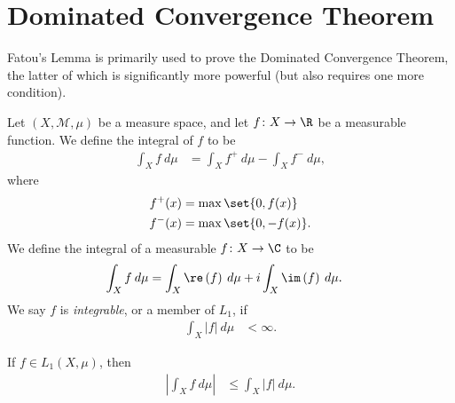\documentclass[10pt]{mypackage}
\begin{document}
\section{Dominated Convergence Theorem}%
Fatou's Lemma is primarily used to prove the Dominated Convergence Theorem, the latter of which is significantly more powerful (but also requires one more condition).
\begin{definition}
  Let $\left( X,\mathcal{M},\mu \right)$ be a measure space, and let $f\colon X\rightarrow \R$ be a measurable function. We define the integral of $f$ to be
  \begin{align*}
    \int_{X}^{} f\:d\mu &= \int_{X}^{} f^{+}\:d\mu - \int_{X}^{} f^{-}\:d\mu,
  \end{align*}
  where
  \begin{align*}
    f^{+}(x) &= \max\set{0,f(x)}\\
    f^{-}(x) &= \max\set{0,-f(x)}.
  \end{align*}
  We define the integral of a measurable $f\colon X\rightarrow \C$ to be
  \begin{align*}
    \int_{X}^{} f\:d\mu &= \int_{X}^{} \re\left( f \right)\:d\mu + i\int_{X}^{} \im\left( f \right)\:d\mu.
  \end{align*}
  We say $f$ is \textit{integrable}, or a member of $L_1$, if
  \begin{align*}
    \int_{X}^{} \left\vert f \right\vert\:d\mu &< \infty.
  \end{align*}
\end{definition}
\begin{proposition}
  If $f\in L_1\left( X,\mu \right)$, then
  \begin{align*}
    \left\vert \int_{X}^{} f\:d\mu \right\vert &\leq \int_{X}^{} \left\vert f \right\vert\:d\mu.
  \end{align*}
\end{proposition}
\end{document}

